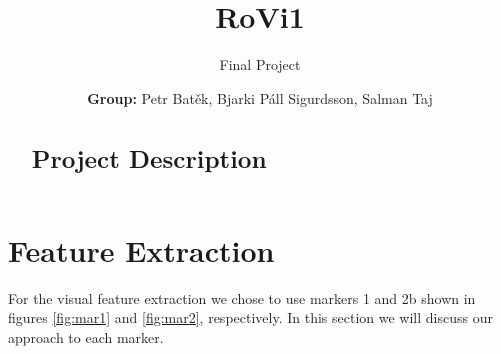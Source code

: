 \documentclass[]{scrartcl}
\title{RoVi1}
\subtitle{Final Project \vspace{2cm}}
\author{\textbf{Group:} Petr Batěk,  Bjarki Páll Sigurdsson, Salman Taj}
\begin{document}
	
	\maketitle
	
	\newpage

\begin{abstract}
\section*{Project Description}


\end{abstract}

\section{Feature Extraction}
For the visual feature extraction we chose to use markers 1 and 2b shown in figures \ref{fig:mar1} and \ref{fig:mar2}, respectively. In this section we will discuss our approach to each marker.
\end{document}
